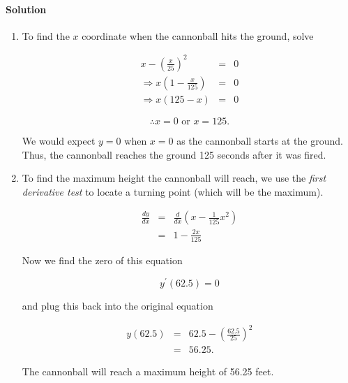 
\paragraph{Solution}


\begin{enumerate}
	\item
		To find the $x$ coordinate when the cannonball hits the ground, solve

		\begin{eqnarray*}
			x-\left(\frac{x}{25}\right)^2&=&0\\
			\Rightarrow x\left(1-\frac{x}{125}\right)&=&0\\
			\Rightarrow x\left(125-x\right)&=&0
		\end{eqnarray*}

		\[\therefore x=0\mbox{ or }x=125.\]

		We would expect $y=0$ when $x=0$ as the cannonball starts at the ground. Thus, the cannonball reaches the ground 125 seconds after it was fired.

	\item
		To find the maximum height the cannonball will reach, we use the \emph{first derivative test} to locate a turning point (which will be the maximum).

		\begin{eqnarray*}
			\frac{dy}{dx}&=&\frac{d}{dx}\left(x-\frac{1}{125}x^2\right)\\
			&=&1-\frac{2x}{125}
		\end{eqnarray*}

		Now we find the zero of this equation

		\[y^\prime\left(62.5\right)=0\]

		and plug this back into the original equation

		\begin{eqnarray*}
			y\left(62.5\right)&=&62.5-\left(\frac{62.5}{25}\right)^2\\
			&=&56.25.
		\end{eqnarray*}

		The cannonball will reach a maximum height of 56.25 feet.
\end{enumerate}

